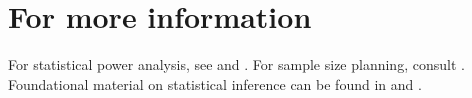 \section*{For more information}
For statistical power analysis, see \citep{cohen1988statistical} and \citep{aberson2011applied}. For sample size planning, consult \citep{maxwell2008sample}. Foundational material on statistical inference can be found in \citep{rice2007mathematical} and \citep{agresti}.
